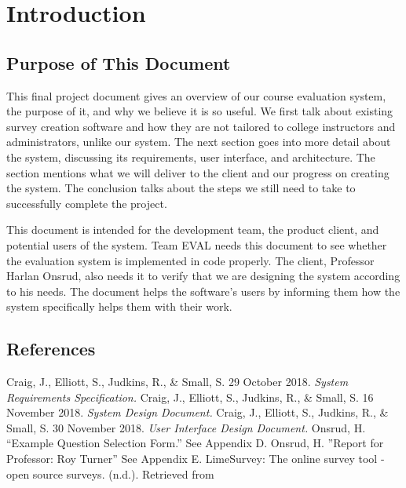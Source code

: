 \documentclass{article}
\begin{document}
\tableofcontents

\newpage

\section{Introduction}
 

\subsection{Purpose of This Document}

This final project document gives an overview of our course evaluation system, the purpose of it, and why we believe it is so useful. We first talk about existing survey creation software and how they are not tailored to college instructors and administrators, unlike our system. The next section goes into more detail about the system, discussing its requirements, user interface, and architecture. The section mentions what we will deliver to the client and our progress on creating the system. The conclusion talks about the steps we still need to take to successfully complete the project.

This document is intended for the development team, the product client, and potential users of the system. Team EVAL needs this document to see whether the evaluation system is implemented in code properly. The client, Professor Harlan Onsrud, also needs it to verify that we are designing the system according to his needs. The document helps the software's users by informing them how the system specifically helps them with their work.

\subsection{References}

Craig, J., Elliott, S., Judkins, R., \& Small, S. 29 October 2018. \textit{System Requirements Specification.}
\vspace{3mm}\newline
Craig, J., Elliott, S., Judkins, R., \& Small, S. 16 November 2018. \textit{System Design Document.}
\vspace{3mm}\newline
Craig, J., Elliott, S., Judkins, R., \& Small, S. 30 November 2018. \textit{User Interface Design Document.}
\vspace{3mm}\newline
Onsrud, H. ``Example Question Selection Form.'' See Appendix D.
\vspace{3mm}\newline
Onsrud, H. ''Report for Professor: Roy Turner'' See Appendix E.
\vspace{3mm}\newline
LimeSurvey: The online survey tool - open source surveys. (n.d.). Retrieved from
\end{document}
